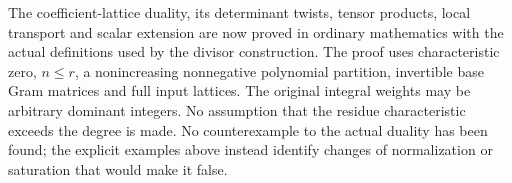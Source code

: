 The coefficient-lattice duality, its determinant twists, tensor
products, local transport and scalar extension are now proved in
ordinary mathematics with the actual definitions used by the divisor
construction. The proof uses characteristic zero, $n\le r$, a
nonincreasing nonnegative polynomial partition, invertible base Gram
matrices and full input lattices. The original integral weights may
be arbitrary dominant integers. No assumption that the residue
characteristic exceeds the degree is made. No counterexample to the
actual duality has been found; the explicit examples above instead
identify changes of normalization or saturation that would make it
false.



